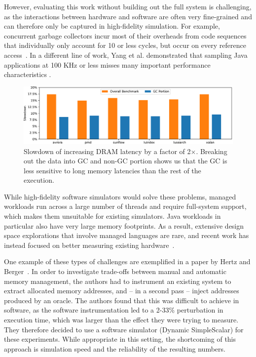 However, evaluating this work without building out the full system is
challenging, as the interactions between hardware and software are often very
fine-grained and can therefore only be captured in high-fidelity simulation.
For example, concurrent garbage collectors incur most of their overheads from
code sequences that individually only account for 10 or less cycles, but occur
on every reference access~\cite{Click:2005:PGA:1064979.1064988}. In a different
line of work, Yang et al. demonstrated that sampling Java applications at 100
KHz or less misses many important performance characteristics
\cite{Yang:2015:CPM:2749469.2750401}.


\begin{figure}[t]
		\centering
		\includegraphics[width=\columnwidth]{results/dacapo-varymodel.pdf}
		\caption{Slowdown of increasing DRAM latency by a factor of 2$\times$. Breaking out the data into GC and non-GC portion shows us that the GC is less sensitive to long memory latencies than the rest of the execution.}
		\label{fig:dacapo_latency2x}
\end{figure}

While high-fidelity software simulators would solve these problems, managed
workloads run across a large number of threads and require full-system support,
which makes them unsuitable for existing simulators. Java workloads in
particular also have very large memory footprints. As a result, extensive
design space explorations that involve managed languages are rare, and recent
work has instead focused on better measuring existing hardware~\cite{Cao:2012:YYP:2337159.2337185,Yang:2015:CPM:2749469.2750401}.

One example of these types of challenges are exemplified in a paper by Hertz
and Berger~\cite{Hertz:2005:QPG:1094811.1094836}. In order to investigate
trade-offs between manual and automatic memory management, the authors had to
instrument an existing system to extract allocated memory addresses, and -- in
a second pass -- inject addresses produced by an oracle. The authors found that
this was difficult to achieve in software, as the software instrumentation led
to a 2-33\% perturbation in execution time, which was larger than the effect
they were trying to measure. They therefore decided to use a software simulator
(Dynamic SimpleScalar) for these experiments. While appropriate in this
setting, the shortcoming of this approach is simulation speed and the
reliability of the resulting numbers.

